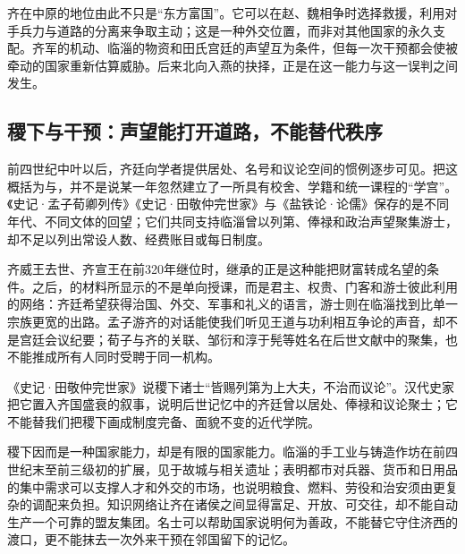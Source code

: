 齐在中原的地位由此不只是“东方富国”。它可以在赵、魏相争时选择救援，利用对手兵力与道路的分离来争取主动；这是一种外交位置，而非对其他国家的永久支配。齐军的机动、临淄的物资和田氏宫廷的声望互为条件，但每一次干预都会使被牵动的国家重新估算威胁。后来北向入燕的抉择，正是在这一能力与这一误判之间发生。

\subsection{稷下与干预：声望能打开道路，不能替代秩序}

前四世纪中叶以后，齐廷向学者提供居处、名号和议论空间的惯例逐步可见。把这概括为与，并不是说某一年忽然建立了一所具有校舍、学籍和统一课程的“学宫”。《史记·孟子荀卿列传》《史记·田敬仲完世家》与《盐铁论·论儒》保存的是不同年代、不同文体的回望；它们共同支持临淄曾以列第、俸禄和政治声望聚集游士，却不足以列出常设人数、经费账目或每日制度。

齐威王去世、齐宣王在前320年继位时，继承的正是这种能把财富转成名望的条件。之后，的材料所显示的不是单向授课，而是君主、权贵、门客和游士彼此利用的网络：齐廷希望获得治国、外交、军事和礼义的语言，游士则在临淄找到比单一宗族更宽的出路。孟子游齐的对话能使我们听见王道与功利相互争论的声音，却不是宫廷会议纪要；荀子与齐的关联、邹衍和淳于髡等姓名在后世文献中的聚集，也不能推成所有人同时受聘于同一机构。

\begin{textwindow}[《史记》笔下的稷下]
《史记·田敬仲完世家》说稷下诸士“皆赐列第为上大夫，不治而议论”。汉代史家把它置入齐国盛衰的叙事，说明后世记忆中的齐廷曾以居处、俸禄和议论聚士；它不能替我们把稷下画成制度完备、面貌不变的近代学院。
\end{textwindow}

稷下因而是一种国家能力，却是有限的国家能力。临淄的手工业与铸造作坊在前四世纪末至前三级初的扩展，见于故城与相关遗址；表明都市对兵器、货币和日用品的集中需求可以支撑人才和外交的市场，也说明粮食、燃料、劳役和治安须由更复杂的调配来负担。知识网络让齐在诸侯之间显得富足、开放、可交往，却不能自动生产一个可靠的盟友集团。名士可以帮助国家说明何为善政，不能替它守住济西的渡口，更不能抹去一次外来干预在邻国留下的记忆。

